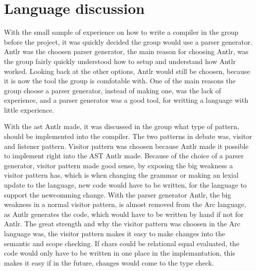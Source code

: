 \section*{Language discussion}
With the small sample of experience on how to write a compiler in the group before the project, it was quickly decided the group would use a parser generator. Antlr was the choosen parser generator, the main reason for choosing Antlr, was the group fairly quickly understood how to setup and understand how Antlr worked. Looking back at the other options, Antlr would still be choosen, because it is now the tool the group is comfotable with. One of the main reasons the group choose a parser generator, instead of making one, was the lack of experience, and a parser generator was a good tool, for writting a language with little experience.

With the \gls{ast} Antlr made, it was discussed in the group what type of pattern, should be implemented into the compiler. The two patterns in debate was, visitor and listener pattern. Visitor pattern was choosen because Antlr made it possible to implement right into the AST Antlr made. Because of the choice of a parser generator, visitor pattern made good sense, by exposing the big weakness a visitor pattern has, which is when changing the grammar or making an lexial update to the language, new code would have to be written, for the language to support the newcomming change. With the parser generator Antlr, the big weakness in a normal visitor pattern, is almost removed from the Arc language, as Antlr generates the code, which would have to be written by hand if not for Antlr. The great strength and why the visitor pattern was choosen in the Arc language was, the visitor pattern makes it easy to make changes into the semantic and scope checking. If chars could be relational equal evaluated, the code would only have to be written in one place in the implemantation, this makes it easy if in the future, changes would come to the type check. 

